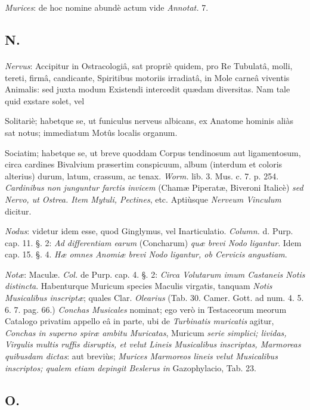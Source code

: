 \documentclass[a4paper, 11pt, oneside, polutonikogreek, german]{article}
\begin{document}
\emph{Murices}: de hoc nomine abundè actum vide \emph{Annotat.} 7.

\subsection{N.}
\paragraph{}
\emph{Nervus}: Accipitur in Ostracologiâ, sat propriè quidem, pro Re Tubulatâ, molli, tereti, firmâ, candicante, Spiritibus motoriis irradiatâ, in Mole carneâ viventis Animalis: sed juxta modum Existendi intercedit quædam diversitas. Nam tale quid exstare solet, vel

Solitariè; habetque se, ut funiculus nerveus albicans, ex Anatome hominis aliàs sat notus; immediatum Motûs localis organum.

Sociatim; habetque se, ut breve quoddam Corpus tendinosum aut ligamentosum, circa cardines Bivalvium præsertim conspicuum, album (interdum et coloris alterius) durum, latum, crassum, ac tenax. \emph{Worm.} lib. 3. Mus. c. 7. p. 254. \emph{Cardinibus non junguntur farctis invicem} (Chamæ Piperatæ, Biveroni Italicè) \emph{sed Nervo, ut Ostrea. Item Mytuli, Pectines}, etc. Aptiùsque \emph{Nerveum Vinculum} dicitur.

\emph{Nodus}: videtur idem esse, quod Ginglymus, vel Inarticulatio. \emph{Column.} d. Purp. cap. 11. §. 2: \emph{Ad differentiam earum} (Concharum) \emph{quæ brevi Nodo ligantur}. Idem cap. 15. §. 4. \emph{Hæ omnes Anomiæ brevi Nodo ligantur, ob Cervicis angustiam}.

\emph{Notæ}: Maculæ. \emph{Col.} de Purp. cap. 4. §. 2: \emph{Circa Volutarum imum Castaneis Notis distincta}. Habenturque Muricum species Maculis virgatis, tanquam \emph{Notis Musicalibus inscriptæ}; quales Clar. \emph{Olearius} (Tab. 30. Camer. Gott. ad num. 4. 5. 6. 7. pag. 66.) \emph{Conchas Musicales} nominat; ego verò in Testaceorum meorum Catalogo privatim appello eâ in parte, ubi de \emph{Turbinatis muricatis} agitur, \emph{Conchas in superno spiræ ambitu Muricatas}, Muricum \emph{serie simplici; lividas, Virgulis multis ruffis disruptis, et velut Lineis Musicalibus inscriptas, Marmoreas quibusdam dictas}: aut breviùs; \emph{Murices Marmoreos lineis velut Musicalibus inscriptos; qualem etiam depingit Beslerus in} Gazophylacio, Tab. 23.

\subsection{O.}
\end{document}
